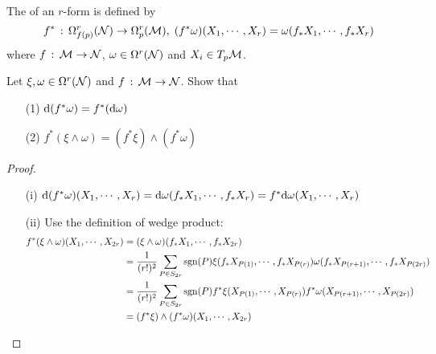 \documentclass[a4paper, 10pt]{article}
\begin{document}
\begin{definition}
    The  of an $r$-form is defined by
    \[ f^{\ast} \,:\, \Omega^{r}_{f(p)}(\mathcal{N}) \rightarrow \Omega^{r}_{p}(\mathcal{M}), \; (f^{\ast}\omega)(X_{1},\cdots,X_{r}) = \omega(f_{\ast}X_{1},\cdots,f_{\ast}X_{r}) \]
    where $f \,:\, \mathcal{M} \rightarrow \mathcal{N}$, $\omega \in \Omega^{r}(\mathcal{N})$ and $X_{i} \in T_{p}\mathcal{M}$.
\end{definition}
\newpage


\begin{exer}
    Let $\xi, \omega \in \Omega^{r}(\mathcal{N})$ and $f\,:\,\mathcal{M}\rightarrow\mathcal{N}$. Show that
    \begin{itemize}
        \item[(1)] $\mathrm{d}(f^{\ast}\omega) = f^{\ast}(\mathrm{d}\omega)$
        \item[(2)] $f^{\ast}(\xi\wedge\omega) = (f^{\ast}\xi)\wedge(f^{\ast}\omega)$
    \end{itemize}
\end{exer}

\begin{proof}
    \hphantom{.}
    \begin{itemize}
        \item[(i)] $\mathrm{d}(f^{\ast}\omega)(X_{1},\cdots,X_{r}) = \mathrm{d}\omega(f_{\ast}X_{1},\cdots,f_{\ast}X_{r}) = f^{\ast}\mathrm{d}\omega(X_{1},\cdots,X_{r})$
        \item[(ii)] Use the definition of wedge product:
        \begin{align*}
            f^{\ast}(\xi\wedge\omega)(X_{1},\cdots,X_{2r}) &= (\xi\wedge\omega)(f_{\ast}X_{1},\cdots,f_{\ast}X_{2r}) \\
            &= \frac{1}{(r!)^{2}}\sum_{P \in S_{2r}}\mathrm{sgn}(P)\xi(f_{\ast}X_{P(1)},\cdots,f_{\ast}X_{P(r)})\omega(f_{\ast}X_{P(r+1)},\cdots,f_{\ast}X_{P(2r)}) \\
            &= \frac{1}{(r!)^{2}}\sum_{P \in S_{2r}}\mathrm{sgn}(P)f^{\ast}\xi(X_{P(1)},\cdots,X_{P(r)})f^{\ast}\omega(X_{P(r+1)},\cdots,X_{P(2r)}) \\
            &= (f^{\ast}\xi)\wedge(f^{\ast}\omega)(X_{1},\cdots,X_{2r})
        \end{align*}
    \end{itemize}
\end{proof}
\end{document}

